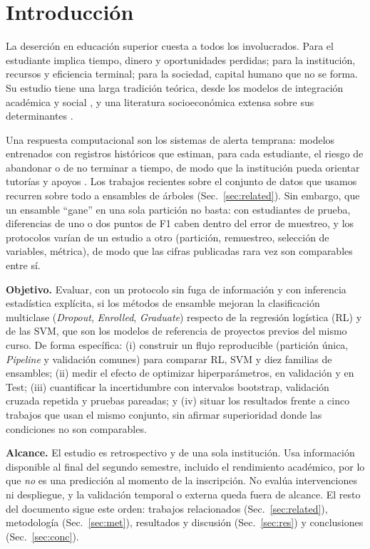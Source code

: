 \documentclass[conference]{IEEEtran}
\newcommand{\cD}{\emph{Dropout}}
\newcommand{\cE}{\emph{Enrolled}}
\newcommand{\cG}{\emph{Graduate}}
\begin{document}
\section{Introducción}\label{sec:intro}
La deserción en educación superior cuesta a todos los involucrados. Para el estudiante implica tiempo, dinero y oportunidades perdidas; para la institución, recursos y eficiencia terminal; para la sociedad, capital humano que no se forma. Su estudio tiene una larga tradición teórica, desde los modelos de integración académica y social \cite{tinto1975}, y una literatura socioeconómica extensa sobre sus determinantes \cite{aina2022}.

Una respuesta computacional son los sistemas de alerta temprana: modelos entrenados con registros históricos que estiman, para cada estudiante, el riesgo de abandonar o de no terminar a tiempo, de modo que la institución pueda orientar tutorías y apoyos \cite{kemper2020,martins2023,carballo2025}. Los trabajos recientes sobre el conjunto de datos que usamos recurren sobre todo a ensambles de árboles (Sec.~\ref{sec:related}). Sin embargo, que un ensamble ``gane'' en una sola partición no basta: con \Nte{} estudiantes de prueba, diferencias de uno o dos puntos de F1 caben dentro del error de muestreo, y los protocolos varían de un estudio a otro (partición, remuestreo, selección de variables, métrica), de modo que las cifras publicadas rara vez son comparables entre sí.

\textbf{Objetivo.} Evaluar, con un protocolo sin fuga de información y con inferencia estadística explícita, si los métodos de ensamble mejoran la clasificación multiclase (\cD, \cE, \cG) respecto de la regresión logística (RL) y de las SVM, que son los modelos de referencia de proyectos previos del mismo curso. De forma específica: (i) construir un flujo reproducible (partición única, \emph{Pipeline} y validación comunes) para comparar RL, SVM y diez familias de ensambles; (ii) medir el efecto de optimizar hiperparámetros, en validación y en Test; (iii) cuantificar la incertidumbre con intervalos bootstrap, validación cruzada repetida y pruebas pareadas; y (iv) situar los resultados frente a cinco trabajos que usan el mismo conjunto, sin afirmar superioridad donde las condiciones no son comparables.

\textbf{Alcance.} El estudio es retrospectivo y de una sola institución. Usa información disponible al final del segundo semestre, incluido el rendimiento académico, por lo que \emph{no} es una predicción al momento de la inscripción. No evalúa intervenciones ni despliegue, y la validación temporal o externa queda fuera de alcance. El resto del documento sigue este orden: trabajos relacionados (Sec.~\ref{sec:related}), metodología (Sec.~\ref{sec:met}), resultados y discusión (Sec.~\ref{sec:res}) y conclusiones (Sec.~\ref{sec:conc}).
\end{document}

